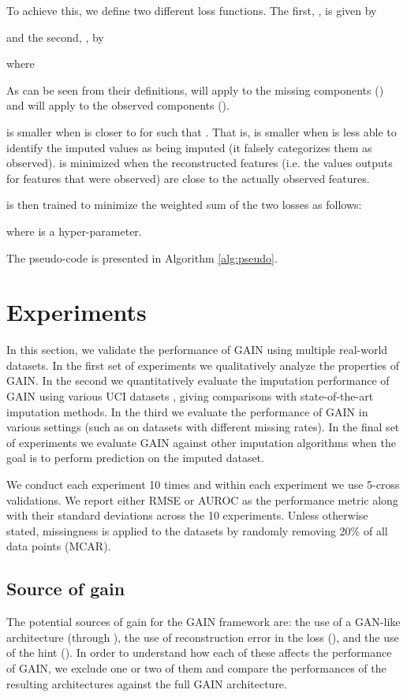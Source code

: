 \documentclass{article}
\begin{document}
To achieve this, we define two different loss functions. The first, , is given by

and the second, , by

where

As can be seen from their definitions,  will apply to the missing components () and  will apply to the observed components ().

 is smaller when  is closer to  for  such that . That is,  is smaller when  is less able to identify the imputed values as being imputed (it falsely categorizes them as observed).  is minimized when the reconstructed features (i.e. the values  outputs for features that were observed) are close to the actually observed features.

 is then trained to minimize the weighted sum of the two losses as follows:

where  is a hyper-parameter. 

The pseudo-code is presented in Algorithm \ref{alg:pseudo}.


\section{Experiments}\label{sect:experiments}
In this section, we validate the performance of GAIN using multiple real-world datasets. In the first set of experiments we qualitatively analyze the properties of GAIN. In the second we quantitatively evaluate the imputation performance of GAIN using various UCI datasets \cite{UCI}, giving comparisons with state-of-the-art imputation methods. In the third we evaluate the performance of GAIN in various settings (such as on datasets with different missing rates). In the final set of experiments we evaluate GAIN against other imputation algorithms when the goal is to perform prediction on the imputed dataset.

We conduct each experiment 10 times and within each experiment we use 5-cross validations. We report either RMSE or AUROC as the performance metric along with their standard deviations across the 10 experiments. Unless otherwise stated, missingness is applied to the datasets by randomly removing 20\% of all data points (MCAR).

\subsection{Source of gain}
The potential sources of gain for the GAIN framework are: the use of a GAN-like architecture (through ), the use of reconstruction error in the loss (), and the use of the hint (). In order to understand how each of these affects the performance of GAIN, we exclude one or two of them and compare the performances of the resulting architectures against the full GAIN architecture.
\end{document}
